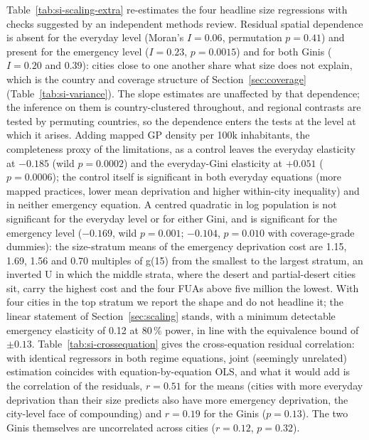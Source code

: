 \documentclass[11pt]{article}
\newcommand{\gref}{g(15)}          %
\begin{document}
Table~\ref{tab:si-scaling-extra} re-estimates the four headline size
regressions with checks suggested by an independent methods review.
Residual spatial dependence is absent for the everyday level (Moran's
$I = 0.06$, permutation $p = 0.41$) and present for the emergency level
($I = 0.23$, $p = 0.0015$) and for both Ginis ($I = 0.20$ and $0.39$):
cities close to one another share what size does not explain, which is
the country and coverage structure of Section~\ref{sec:coverage}
(Table~\ref{tab:si-variance}). The slope estimates are unaffected by that
dependence; the inference on them is country-clustered throughout, and
regional contrasts are tested by permuting countries, so the dependence
enters the tests at the level at which it arises. Adding mapped GP
density per 100k inhabitants, the completeness proxy of the limitations,
as a control leaves the everyday elasticity at $-0.185$ (wild
$p = 0.0002$) and the everyday-Gini elasticity at $+0.051$ ($p = 0.0006$);
the control itself is significant in both everyday equations (more mapped
practices, lower mean deprivation and higher within-city inequality) and
in neither emergency equation. A centred quadratic in log population is
not significant for the everyday level or for either Gini, and is
significant for the emergency level ($-0.169$, wild $p = 0.001$; $-0.104$,
$p = 0.010$ with coverage-grade dummies): the size-stratum means of the
emergency deprivation cost are 1.15, 1.69, 1.56 and 0.70 multiples of
\gref{} from the smallest to the largest stratum, an inverted U in which
the middle strata, where the desert and partial-desert cities sit, carry
the highest cost and the four FUAs above five million the lowest. With
four cities in the top stratum we report the shape and do not headline
it; the linear statement of Section~\ref{sec:scaling} stands, with a
minimum detectable emergency elasticity of 0.12 at 80\,\% power, in line
with the equivalence bound of $\pm 0.13$. Table~\ref{tab:si-crossequation}
gives the cross-equation residual correlation: with identical regressors
in both regime equations, joint (seemingly unrelated) estimation
coincides with equation-by-equation OLS, and what it would add is the
correlation of the residuals, $r = 0.51$ for the means (cities with more
everyday deprivation than their size predicts also have more emergency
deprivation, the city-level face of compounding) and $r = 0.19$ for the
Ginis ($p = 0.13$). The two Ginis themselves are uncorrelated across
cities ($r = 0.12$, $p = 0.32$).



\end{document}
